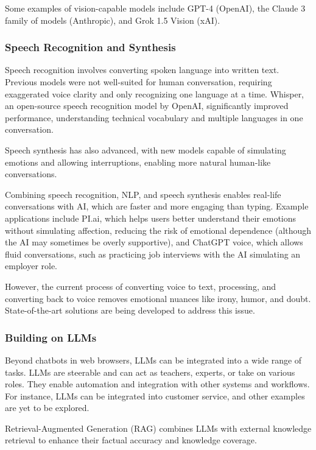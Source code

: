 \documentclass{article}
\begin{document}
Some examples of vision-capable models include GPT-4 (OpenAI), the Claude 3 family of models (Anthropic), and Grok 1.5 Vision (xAI).

\subsubsection{Speech Recognition and Synthesis}

Speech recognition involves converting spoken language into written text. Previous models were not well-suited for human conversation, requiring exaggerated voice clarity and only recognizing one language at a time. Whisper, an open-source speech recognition model by OpenAI, significantly improved performance, understanding technical vocabulary and multiple languages in one conversation.

Speech synthesis has also advanced, with new models capable of simulating emotions and allowing interruptions, enabling more natural human-like conversations.

Combining speech recognition, NLP, and speech synthesis enables real-life conversations with AI, which are faster and more engaging than typing. Example applications include PI.ai, which helps users better understand their emotions without simulating affection, reducing the risk of emotional dependence (although the AI may sometimes be overly supportive), and ChatGPT voice, which allows fluid conversations, such as practicing job interviews with the AI simulating an employer role.

However, the current process of converting voice to text, processing, and converting back to voice removes emotional nuances like irony, humor, and doubt. State-of-the-art solutions are being developed to address this issue.

\subsubsection{Building on LLMs} %

Beyond chatbots in web browsers, LLMs can be integrated into a wide range of tasks. LLMs are steerable and can act as teachers, experts, or take on various roles. They enable automation and integration with other systems and workflows. For instance, LLMs can be integrated into customer service, and other examples are yet to be explored.

Retrieval-Augmented Generation (RAG) combines LLMs with external knowledge retrieval to enhance their factual accuracy and knowledge coverage.
\end{document}
